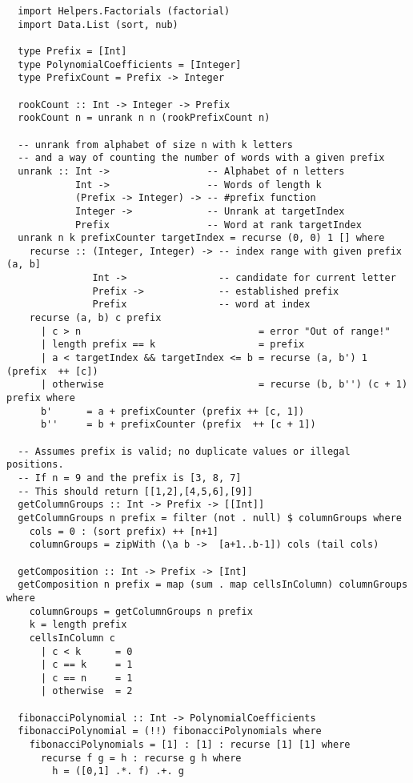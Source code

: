 \begin{lstlisting}
  import Helpers.Factorials (factorial)
  import Data.List (sort, nub)

  type Prefix = [Int]
  type PolynomialCoefficients = [Integer]
  type PrefixCount = Prefix -> Integer

  rookCount :: Int -> Integer -> Prefix
  rookCount n = unrank n n (rookPrefixCount n)

  -- unrank from alphabet of size n with k letters
  -- and a way of counting the number of words with a given prefix
  unrank :: Int ->                 -- Alphabet of n letters
            Int ->                 -- Words of length k
            (Prefix -> Integer) -> -- #prefix function
            Integer ->             -- Unrank at targetIndex
            Prefix                 -- Word at rank targetIndex
  unrank n k prefixCounter targetIndex = recurse (0, 0) 1 [] where
    recurse :: (Integer, Integer) -> -- index range with given prefix (a, b]
               Int ->                -- candidate for current letter
               Prefix ->             -- established prefix
               Prefix                -- word at index
    recurse (a, b) c prefix
      | c > n                               = error "Out of range!"
      | length prefix == k                  = prefix
      | a < targetIndex && targetIndex <= b = recurse (a, b') 1 (prefix  ++ [c])
      | otherwise                           = recurse (b, b'') (c + 1) prefix where
      b'      = a + prefixCounter (prefix ++ [c, 1])
      b''     = b + prefixCounter (prefix  ++ [c + 1])

  -- Assumes prefix is valid; no duplicate values or illegal positions.
  -- If n = 9 and the prefix is [3, 8, 7]
  -- This should return [[1,2],[4,5,6],[9]]
  getColumnGroups :: Int -> Prefix -> [[Int]]
  getColumnGroups n prefix = filter (not . null) $ columnGroups where
    cols = 0 : (sort prefix) ++ [n+1]
    columnGroups = zipWith (\a b ->  [a+1..b-1]) cols (tail cols)

  getComposition :: Int -> Prefix -> [Int]
  getComposition n prefix = map (sum . map cellsInColumn) columnGroups where
    columnGroups = getColumnGroups n prefix
    k = length prefix
    cellsInColumn c
      | c < k      = 0
      | c == k     = 1
      | c == n     = 1
      | otherwise  = 2

  fibonacciPolynomial :: Int -> PolynomialCoefficients
  fibonacciPolynomial = (!!) fibonacciPolynomials where
    fibonacciPolynomials = [1] : [1] : recurse [1] [1] where
      recurse f g = h : recurse g h where
        h = ([0,1] .*. f) .+. g


\end{lstlisting}
